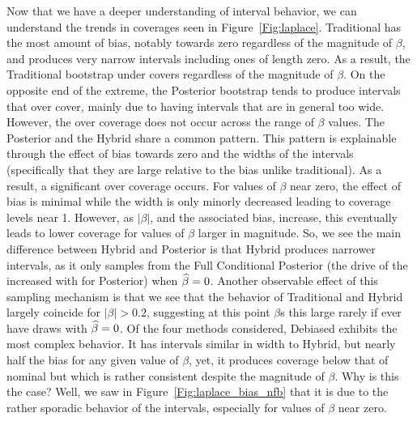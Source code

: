 Now that we have a deeper understanding of interval behavior, we can understand the trends in coverages seen in Figure~\ref{Fig:laplace}. Traditional has the most amount of bias, notably towards zero regardless of the magnitude of $\beta$, and produces very narrow intervals including ones of length zero. As a result, the Traditional bootstrap under covers regardless of the magnitude of $\beta$. On the opposite end of the extreme, the Posterior bootstrap tends to produce intervals that over cover, mainly due to having intervals that are in general too wide. However, the over coverage does not occur across the range of $\beta$ values. The Posterior and the Hybrid share a common pattern. This pattern is explainable through the effect of bias towards zero and the widths of the intervals (specifically that they are large relative to the bias unlike traditional). As a result, a significant over coverage occurs. For values of $\beta$ near zero, the effect of bias is minimal while the width is only minorly decreased leading to coverage levels near 1. However, as $|\beta|$, and the associated bias, increase, this eventually leads to lower coverage for values of $\beta$ larger in magnitude. So, we see the main difference between Hybrid and Posterior is that Hybrid produces narrower intervals, as it only samples from the Full Conditional Posterior (the drive of the increased with for Posterior) when $\widehat{\beta} = 0$. Another observable effect of this sampling mechanism is that we see that the behavior of Traditional and Hybrid largely coincide for $|\beta| > 0.2$, suggesting at this point $\beta$s this large rarely if ever have draws with $\widehat{\beta} = 0$. Of the four methods considered, Debiased exhibits the most complex behavior. It has intervals similar in width to Hybrid, but nearly half the bias for any given value of $\beta$, yet, it produces coverage below that of nominal but which is rather consistent despite the magnitude of $\beta$. Why is this the case? Well, we saw in Figure~\ref{Fig:laplace_bias_nfb} that it is due to the rather sporadic behavior of the intervals, especially for values of $\beta$ near zero. 


